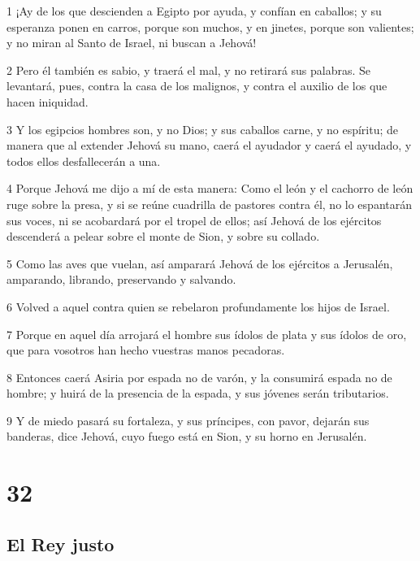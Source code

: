 \par 1 ¡Ay de los que descienden a Egipto por ayuda, y confían en caballos; y su esperanza ponen en carros, porque son muchos, y en jinetes, porque son valientes; y no miran al Santo de Israel, ni buscan a Jehová!
\par 2 Pero él también es sabio, y traerá el mal, y no retirará sus palabras. Se levantará, pues, contra la casa de los malignos, y contra el auxilio de los que hacen iniquidad.
\par 3 Y los egipcios hombres son, y no Dios; y sus caballos carne, y no espíritu; de manera que al extender Jehová su mano, caerá el ayudador y caerá el ayudado, y todos ellos desfallecerán a una.
\par 4 Porque Jehová me dijo a mí de esta manera: Como el león y el cachorro de león ruge sobre la presa, y si se reúne cuadrilla de pastores contra él, no lo espantarán sus voces, ni se acobardará por el tropel de ellos; así Jehová de los ejércitos descenderá a pelear sobre el monte de Sion, y sobre su collado.
\par 5 Como las aves que vuelan, así amparará Jehová de los ejércitos a Jerusalén, amparando, librando, preservando y salvando.
\par 6 Volved a aquel contra quien se rebelaron profundamente los hijos de Israel.
\par 7 Porque en aquel día arrojará el hombre sus ídolos de plata y sus ídolos de oro, que para vosotros han hecho vuestras manos pecadoras. 
\par 8 Entonces caerá Asiria por espada no de varón, y la consumirá espada no de hombre; y huirá de la presencia de la espada, y sus jóvenes serán tributarios.
\par 9 Y de miedo pasará su fortaleza, y sus príncipes, con pavor, dejarán sus banderas, dice Jehová, cuyo fuego está en Sion, y su horno en Jerusalén.

\chapter{32}

\section*{El Rey justo}

